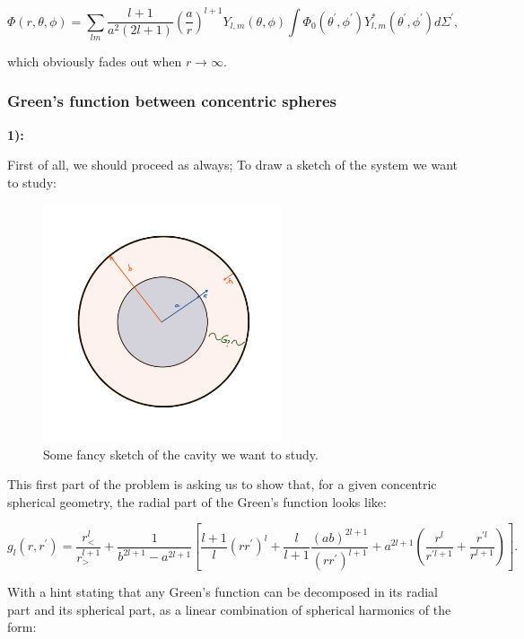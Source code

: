 \begin{equation}
	\Phi(r, \theta, \phi)=\sum_{l m}\frac{l+1}{a^{2} (2l+1)}\left(\frac{a}{r}\right)^{l+1} Y_{l, m}(\theta, \phi) \int \Phi_{0}\left(\theta^{\prime}, \phi^{\prime}\right) Y_{l, m}^{*}\left(\theta^{\prime}, \phi^{\prime}\right) d \Sigma^{\prime},
\end{equation}

which obviously fades out when $r\rightarrow \infty$.

\subsubsection{Green's function between concentric spheres}\label{Green's function between concentric spheres}

\textbf{1):}

First of all, we should proceed as always; To draw a sketch of the system we want to study:
	
\begin{figure}[h]
	\includegraphics[width=7cm]{figures/Concentric.png}
	\centering
	\caption{Some fancy sketch of the cavity we want to study.}
\end{figure}

This first part of the problem is asking us to show that, for a given concentric spherical geometry, the radial part of the Green's function looks like:

\begin{equation}
	g_{l}\left(r, r^{\prime}\right)=\frac{r_{<}^{l}}{r_{>}^{l+1}}+\frac{1}{b^{2 l+1}-a^{2 l+1}}\left[\frac{l+1}{l}\left(r r^{\prime}\right)^{l}+\frac{l}{l+1} \frac{(a b)^{2 l+1}}{\left(r r^{\prime}\right)^{l+1}}+a^{2 l+1}\left(\frac{r^{l}}{r^{\prime l+1}}+\frac{r^{' l}}{r^{l+1}}\right)\right].
\end{equation}

With a hint stating that any Green's function can be decomposed in its radial part and its spherical part, as a linear combination of spherical harmonics of the form:

